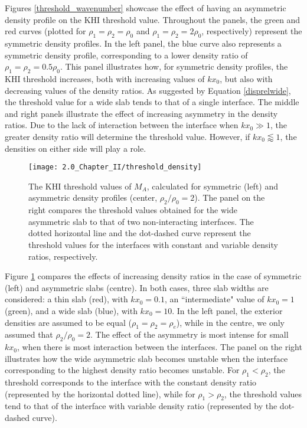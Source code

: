 Figures \ref{threshold_wavenumber} showcase the effect of having an asymmetric density profile on the KHI threshold value.
Throughout the panels, the green and red curves (plotted for $\rho_1 = \rho_2 =  \rho_0$ and $\rho_1 = \rho_2 = 2 \rho_0$, respectively) represent the symmetric density profiles.
In the left panel, the blue curve also represents a symmetric density profile, corresponding to a lower density ratio of $\rho_1 = \rho_2 = 0.5 \rho_0$.
This panel illustrates how, for symmetric density profiles, the KHI threshold increases, both with increasing values of $k x_0$, but also with decreasing values of the density ratios.
As suggested by Equation \eqref{disprelwide}, the threshold value for a wide slab tends to that of a single interface.
The middle and right panels illustrate the effect of increasing asymmetry in the density ratios.
Due to the lack of interaction between the interface when $k x_0 \gg 1$, the greater density ratio will determine the threshold value. However, if $k x_0 \lessapprox 1$, the densities on either side will play a role.

\begin{figure}[!t]
\centering
\texttt{[image: 2.0\_Chapter\_II/threshold\_density]}
\caption{The KHI threshold values of $M_A$, calculated for symmetric (left) and asymmetric density profiles (center, $\rho_2/\rho_0=2$).
The panel on the right compares the threshold values obtained for the wide asymmetric slab to that of two non-interacting interfaces.
The dotted horizontal line and the dot-dashed curve represent the threshold values for the interfaces with constant and variable density ratios, respectively.}
\label{threshold_density}
\end{figure}

Figure \ref{threshold_density} compares the effects of increasing density ratios in the case of symmetric (left) and asymmetric slabs (centre).
In both cases, three slab widths are considered: a thin slab (red), with $k x_0 = 0.1$, an ``intermediate" value of $k x_0 = 1$ (green), and a wide slab (blue), with $k x_0 = 10$.
In the left panel, the exterior densities are assumed to be equal ($\rho_1 = \rho_2 = \rho_e$), while in the centre, we only assumed that $\rho_2/\rho_0 = 2$. 
The effect of the asymmetry is most intense for small $k x_0$, when there is most interaction between the interfaces.
The panel on the right illustrates how the wide asymmetric slab becomes unstable when the interface corresponding to the highest density ratio becomes unstable.
For $\rho_1 < \rho_2$, the threshold corresponds to the interface with the constant density ratio (represented by the horizontal dotted line), while for $\rho_1 > \rho_2$, the threshold values tend to that of the interface with variable density ratio (represented by the dot-dashed curve).

